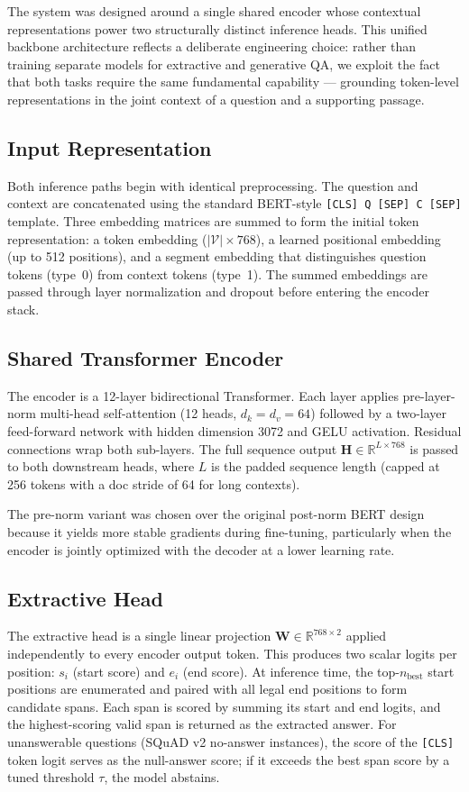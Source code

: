 \documentclass[10pt,twocolumn]{article}
\begin{document}
The system was designed around a single shared encoder whose contextual
representations power two structurally distinct inference heads. This
unified backbone architecture reflects a deliberate engineering choice:
rather than training separate models for extractive and generative QA,
we exploit the fact that both tasks require the same fundamental
capability --- grounding token-level representations in the joint
context of a question and a supporting passage.

\subsection{Input Representation}
Both inference paths begin with identical preprocessing. The question
and context are concatenated using the standard BERT-style
\texttt{[CLS] Q [SEP] C [SEP]} template. Three embedding matrices are
summed to form the initial token representation: a token embedding
($|\mathcal{V}| \times 768$), a learned positional embedding (up to
512 positions), and a segment embedding that distinguishes question
tokens (type~0) from context tokens (type~1). The summed embeddings
are passed through layer normalization and dropout before entering the
encoder stack.

\subsection{Shared Transformer Encoder}
The encoder is a 12-layer bidirectional Transformer. Each layer
applies pre-layer-norm multi-head self-attention (12 heads,
$d_k = d_v = 64$) followed by a two-layer feed-forward network with
hidden dimension 3072 and GELU activation. Residual connections wrap
both sub-layers. The full sequence output
$\mathbf{H} \in \mathbb{R}^{L \times 768}$ is passed to both
downstream heads, where $L$ is the padded sequence length (capped
at 256 tokens with a doc stride of 64 for long contexts).

The pre-norm variant was chosen over the original post-norm BERT
design because it yields more stable gradients during fine-tuning,
particularly when the encoder is jointly optimized with the decoder
at a lower learning rate.

\subsection{Extractive Head}
The extractive head is a single linear projection
$\mathbf{W} \in \mathbb{R}^{768 \times 2}$ applied independently to
every encoder output token. This produces two scalar logits per
position: $s_i$ (start score) and $e_i$ (end score). At inference
time, the top-$n_{\text{best}}$ start positions are enumerated and
paired with all legal end positions to form candidate spans. Each span is scored by summing its start and end logits, and the highest-scoring valid
span is returned as the extracted answer. For unanswerable questions
(SQuAD v2 no-answer instances), the score of the \texttt{[CLS]} token
logit serves as the null-answer score; if it exceeds the best span
score by a tuned threshold $\tau$, the model abstains.
\end{document}

